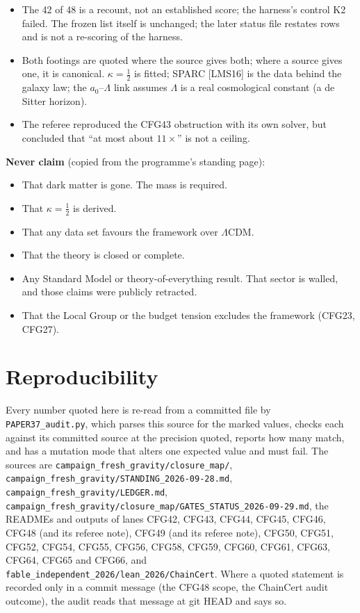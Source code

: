 \documentclass[10pt]{article}
\newcommand{\fpath}[1]{\nolinkurl{#1}}
\begin{document}
\begin{itemize}
\item The 42 of 48 is a recount, not an established score; the harness's control K2 failed. The frozen list itself is unchanged; the later status file restates rows and is not a re-scoring of the harness.
\item Both footings are quoted where the source gives both; where a source gives one, it is canonical. $\kappa=\tfrac12$ is fitted; SPARC [LMS16] is the data behind the galaxy law; the $a_0$--$\Lambda$ link assumes $\Lambda$ is a real cosmological constant (a de Sitter horizon).
\item The referee reproduced the CFG43 obstruction with its own solver, but concluded that ``at most about $11\times$'' is not a ceiling.
\end{itemize}

\textbf{Never claim} (copied from the programme's standing page):
\begin{itemize}
\item That dark matter is gone. The mass is required.
\item That $\kappa=\tfrac12$ is derived.
\item That any data set favours the framework over $\Lambda$CDM.
\item That the theory is closed or complete.
\item Any Standard Model or theory-of-everything result. That sector is walled, and those claims were publicly retracted.
\item That the Local Group or the budget tension excludes the framework (CFG23, CFG27).
\end{itemize}

\section{Reproducibility}\label{sec:rep}

Every number quoted here is re-read from a committed file by \fpath{PAPER37_audit.py}, which parses this source for the marked values, checks each against its committed source at the precision quoted, reports how many match, and has a mutation mode that alters one expected value and must fail. The sources are \fpath{campaign_fresh_gravity/closure_map/}, \fpath{campaign_fresh_gravity/STANDING_2026-09-28.md}, \fpath{campaign_fresh_gravity/LEDGER.md}, \fpath{campaign_fresh_gravity/closure_map/GATES_STATUS_2026-09-29.md}, the READMEs and outputs of lanes CFG42, CFG43, CFG44, CFG45, CFG46, CFG48 (and its referee note), CFG49 (and its referee note), CFG50, CFG51, CFG52, CFG54, CFG55, CFG56, CFG58, CFG59, CFG60, CFG61, CFG63, CFG64, CFG65 and CFG66, and \fpath{fable_independent_2026/lean_2026/ChainCert}. Where a quoted statement is recorded only in a commit message (the CFG48 scope, the ChainCert audit outcome), the audit reads that message at git HEAD and says so.
\end{document}
